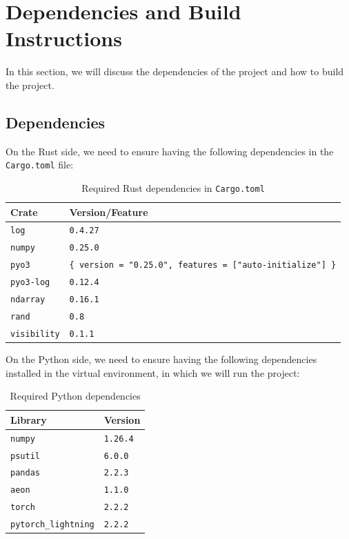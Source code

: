 \documentclass[review]{AIM_report}
\begin{document}
\newpage
\section{Dependencies and Build Instructions}
In this section, we will discuss the dependencies of the project and how to build the project.

\subsection{Dependencies}
On the Rust side, we need to ensure having the following dependencies in the \texttt{Cargo.toml} file:

\begin{table}[h]
\centering
\begin{tabular}{|l|l|}
\hline
\textbf{Crate} & \textbf{Version/Feature} \\
\hline
\texttt{log} & \texttt{0.4.27} \\
\texttt{numpy} & \texttt{0.25.0} \\
\texttt{pyo3} & \texttt{\{ version = "0.25.0", features = ["auto-initialize"] \}} \\
\texttt{pyo3-log} & \texttt{0.12.4} \\
\texttt{ndarray} & \texttt{0.16.1} \\
\texttt{rand} & \texttt{0.8} \\
\texttt{visibility} & \texttt{0.1.1} \\
\hline
\end{tabular}
\caption{Required Rust dependencies in \texttt{Cargo.toml}}
\end{table}

On the Python side, we need to ensure having the following dependencies installed in the virtual environment, in which we will run the project:

\begin{table}[h]
    \centering
    \begin{tabular}{|l|l|}
        \hline
        \textbf{Library} & \textbf{Version} \\
        \hline
        \texttt{numpy} & \texttt{1.26.4} \\
        \texttt{psutil} & \texttt{6.0.0} \\
        \texttt{pandas} & \texttt{2.2.3} \\
        \texttt{aeon} & \texttt{1.1.0} \\
        \texttt{torch} & \texttt{2.2.2} \\
        \texttt{pytorch\_lightning} & \texttt{2.2.2} \\
        \hline
    \end{tabular}
    \caption{Required Python dependencies}
\end{table}
\end{document}
